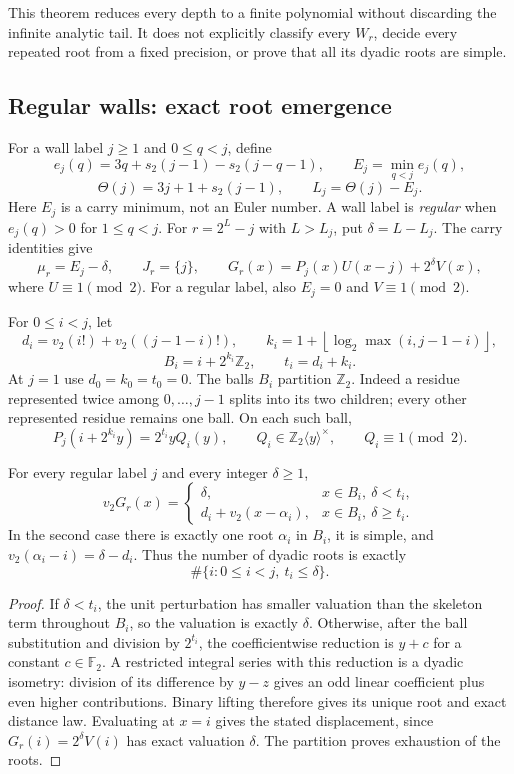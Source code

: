 This theorem reduces every depth to a finite polynomial without discarding
the infinite analytic tail. It does not explicitly classify every
$W_r$, decide every repeated root from a fixed precision, or prove that
all its dyadic roots are simple.

\subsection{Regular walls: exact root emergence}
\label{app:root:regular}

For a wall label $j\ge1$ and $0\le q<j$, define
\[
 e_j(q)=3q+s_2(j-1)-s_2(j-q-1),\qquad
 E_j=\min_{q<j}e_j(q),
\]
\[
 \Theta(j)=3j+1+s_2(j-1),\qquad L_j=\Theta(j)-E_j.
\]
Here $E_j$ is a carry minimum, not an Euler number. A wall label is
\emph{regular} when $e_j(q)>0$ for $1\le q<j$.
For $r=2^L-j$ with $L>L_j$, put $\delta=L-L_j$.
The carry identities give
\[
 \mu_r=E_j-\delta,\qquad J_r=\{j\},\qquad
 G_r(x)=P_j(x)U(x-j)+2^\delta V(x),
\]
where $U\equiv1\pmod2$. For a regular label, also
$E_j=0$ and $V\equiv1\pmod2$.

For $0\le i<j$, let
\[
 d_i=v_2(i!)+v_2((j-1-i)!),\qquad
 k_i=1+\left\lfloor\log_2\max(i,j-1-i)\right\rfloor,
\]
\[
 B_i=i+2^{k_i}\mathbb Z_2,\qquad t_i=d_i+k_i.
\]
At $j=1$ use $d_0=k_0=t_0=0$. The balls $B_i$ partition
$\mathbb Z_2$. Indeed a residue represented twice among $0,\ldots,j-1$
splits into its two children; every other represented residue remains
one ball. On each such ball,
\[
 P_j(i+2^{k_i}y)=2^{t_i}yQ_i(y),\qquad
 Q_i\in\mathbb Z_2\langle y\rangle^\times,
 \qquad Q_i\equiv1\pmod2.
\]

\begin{theorem}
For every regular label $j$ and every integer $\delta\ge1$,
\[
 v_2G_r(x)=
 \begin{cases}
  \delta,&x\in B_i,\ \delta<t_i,\\
  d_i+v_2(x-\alpha_i),&x\in B_i,\ \delta\ge t_i.
 \end{cases}
\]
In the second case there is exactly one root $\alpha_i$ in $B_i$,
it is simple, and $v_2(\alpha_i-i)=\delta-d_i$.
Thus the number of dyadic roots is exactly
\[
 \#\{i:0\le i<j,\ t_i\le\delta\}.
\]
\label{thm:root:regular}
\end{theorem}
\begin{proof}
If $\delta<t_i$, the unit perturbation has smaller valuation than
the skeleton term throughout $B_i$, so the valuation is exactly
$\delta$. Otherwise, after the ball substitution and division by
$2^{t_i}$, the coefficientwise reduction is $y+c$ for a constant
$c\in\mathbb F_2$. A restricted integral series with this reduction
is a dyadic isometry: division of its difference by $y-z$ gives an
odd linear coefficient plus even higher contributions. Binary lifting
therefore gives its unique root and exact distance law. Evaluating at
$x=i$ gives the stated displacement, since
$G_r(i)=2^\delta V(i)$ has exact valuation $\delta$.
The partition proves exhaustion of the roots.
\end{proof}

